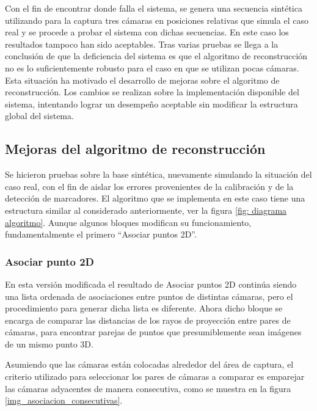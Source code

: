 Con el fin de encontrar donde falla el sistema, se genera una secuencia sintética utilizando  para la captura tres cámaras en posiciones relativas que simula el caso real y se procede a probar el sistema con dichas secuencias.  En este caso los resultados tampoco han sido aceptables. Tras varias pruebas se llega  a la conclusión de que la deficiencia del sistema es que el algoritmo de reconstrucción no es lo suficientemente robusto para el caso en que se utilizan pocas cámaras.\\
Esta situación ha motivado el desarrollo de mejoras sobre el algoritmo de reconstrucción. Los cambios se realizan sobre la implementación disponible del sistema, intentando lograr un desempeño aceptable sin modificar la estructura global del sistema.

\subsection{Mejoras del algoritmo de reconstrucción}


Se hicieron pruebas sobre la base sintética, nuevamente simulando la situación del caso real, con el fin de aislar los errores provenientes de la calibración y de la detección de marcadores.
El algoritmo que se implementa en este caso tiene una estructura similar al considerado anteriormente, ver la figura \ref{fig: diagrama algoritmo}. Aunque algunos bloques modifican su funcionamiento, fundamentalmente el primero  “Asociar puntos 2D”.

\subsubsection{Asociar punto 2D}

En esta versión modificada el resultado de Asociar puntos 2D continúa siendo una lista ordenada de asociaciones entre puntos de distintas cámaras, pero el procedimiento para generar dicha lista es diferente.  Ahora dicho bloque se encarga  de comparar  las distancias de los rayos de proyección entre pares de cámaras, para encontrar parejas de puntos que presumiblemente sean imágenes de un mismo punto 3D.  

Asumiendo que las cámaras están colocadas alrededor del área de captura, el criterio utilizado para seleccionar los pares de cámaras a comparar es emparejar las cámaras adyacentes de manera consecutiva, como se muestra en la figura  \ref{img_asociacion_consecutivas}.

